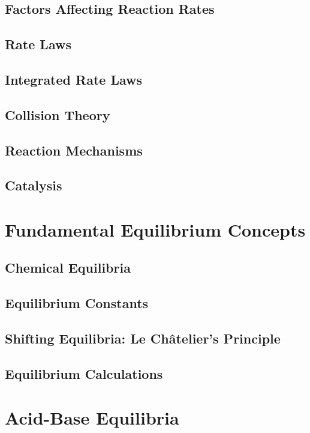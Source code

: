 \documentclass[12pt, openany, letterpaper]{memoir}
\begin{document}
\section{Factors Affecting Reaction Rates}

\section{Rate Laws}

\section{Integrated Rate Laws}

\section{Collision Theory}

\section{Reaction Mechanisms}

\section{Catalysis}

\chapter{Fundamental Equilibrium Concepts}

\section{Chemical Equilibria}

\section{Equilibrium Constants}

\section{Shifting Equilibria: Le Ch\^atelier's Principle}

\section{Equilibrium Calculations}

\chapter{Acid-Base Equilibria}
\end{document}
